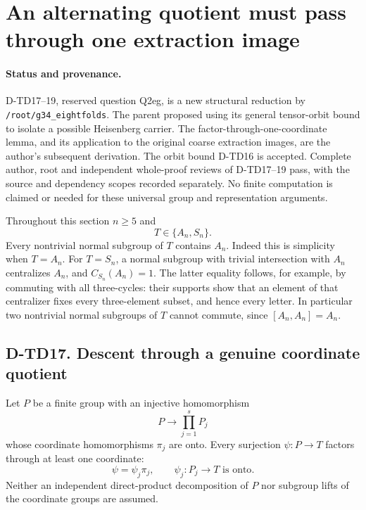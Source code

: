 \section{An alternating quotient must pass through one extraction image}
\label{sec:alternating-quotient-carrier}

\paragraph{Status and provenance.}
D-TD17--19, reserved question Q2eg, is a new structural reduction by
\texttt{/root/g34\_eightfolds}. The parent proposed using its general
tensor-orbit bound to isolate a possible Heisenberg carrier. The
factor-through-one-coordinate lemma, and its application to the original
coarse extraction images, are the author's subsequent derivation.
The orbit bound D-TD16 is accepted. Complete author, root and independent
whole-proof reviews of D-TD17--19 pass, with the source and dependency
scopes recorded separately. No finite computation is
claimed or needed for these universal group and representation arguments.

Throughout this section $n\ge5$ and
\[
                         T\in\{A_n,S_n\}.
 \tag{TDC.1}
\]
Every nontrivial normal subgroup of $T$ contains $A_n$.
Indeed this is simplicity when $T=A_n$. For $T=S_n$, a normal
subgroup with trivial intersection with $A_n$ centralizes $A_n$,
and $C_{S_n}(A_n)=1$. The latter equality follows, for example,
by commuting with all three-cycles: their supports show that an
element of that centralizer fixes every three-element subset,
and hence every letter. In particular two nontrivial normal
subgroups of $T$ cannot commute, since $[A_n,A_n]=A_n$.

\subsection*{D-TD17. Descent through a genuine coordinate quotient}

\begin{lemma}[D-TD17]
Let $P$ be a finite group with an injective homomorphism
\[
              P\longrightarrow\prod_{j=1}^s P_j
 \tag{TDC.2}
\]
whose coordinate homomorphisms $\pi_j$ are onto. Every surjection
$\psi:P\to T$ factors through at least one coordinate:
\[
                 \psi=\psi_j\pi_j,
                 \qquad\psi_j:P_j\longrightarrow T
                 \text{ is onto}.
 \tag{TDC.3}
\]
Neither an independent direct-product decomposition of $P$ nor
subgroup lifts of the coordinate groups are assumed.
\end{lemma}


